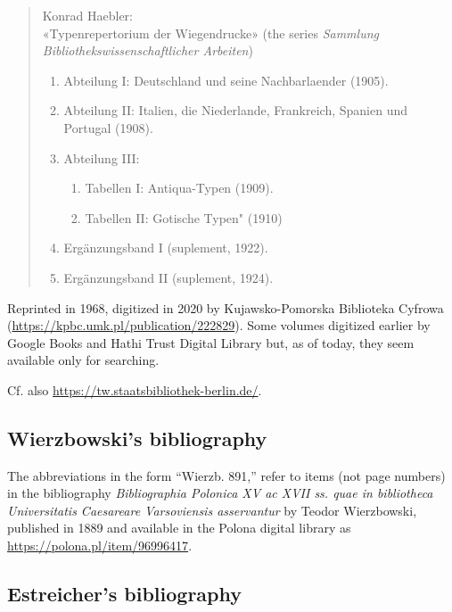\documentclass[12pt]{article}
\begin{document}
\begin{quote}
  Konrad Haebler:\\ «Typenrepertorium der Wiegendrucke» (the series
  \textit{Sammlung Bibliothekswissenschaftlicher Arbeiten})
  \begin{enumerate}
  \item Abteilung I: Deutschland und seine Nachbarlaender (1905).
  \item Abteilung II: Italien, die Niederlande, Frankreich, Spanien und Portugal (1908).
  \item Abteilung III:
    \begin{enumerate}
    \item Tabellen I: Antiqua-Typen (1909).
    \item Tabellen II: Gotische Typen" (1910)
    \end{enumerate}
  \item Ergänzungsband I (suplement, 1922).
  \item Ergänzungsband II (suplement, 1924).
  \end{enumerate}
\end{quote}
Reprinted in 1968, digitized in 2020 by Kujawsko-Pomorska Biblioteka
Cyfrowa (\url{https://kpbc.umk.pl/publication/222829}). Some volumes
digitized earlier by Google Books and Hathi Trust Digital Library but,
as of today, they seem available only for searching.

\noindent
Cf. also \url{https://tw.staatsbibliothek-berlin.de/}.

\subsection{Wierzbowski's bibliography}
\label{sec:wierzb-bibl}

The abbreviations in the form ``Wierzb. 891,'' refer to items (not
page numbers) in the bibliography \textit{Bibliographia Polonica XV ac
  XVII ss. quae in bibliotheca Universitatis Caesareare Varsoviensis
  asservantur} by Teodor Wierzbowski, published in 1889 and available
in the Polona digital library as
\url{https://polona.pl/item/96996417}.

\subsection{Estreicher's bibliography}
\label{sec:estr-bibl}
\end{document}
